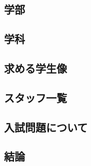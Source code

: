 \subsection{学部}
\subsection{学科}
\subsection{求める学生像}
\subsection{スタッフ一覧}
\subsection{入試問題について}
\subsection{結論}

